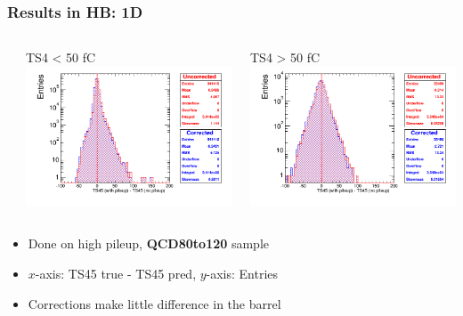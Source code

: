 \documentclass[bigger]{beamer}
\providecommand{\alert}[1]{\textbf{#1}}
\begin{document}
\begin{frame}
\frametitle{Results in HB: 1D}
\label{sec-3-3-3}
\begin{columns} %
\label{sec-3-3-3-1}
\begin{column}{0.55\textwidth}
\label{sec-3-3-3-1-1}

\centering
TS4 < 50 fC
\includegraphics[width=\textwidth]{fig/correction_comparison_1D_sample80to120_under50_ring0.png}
\end{column}
\begin{column}{0.55\textwidth}
\label{sec-3-3-3-1-2}

\centering
TS4 > 50 fC
\includegraphics[width=\textwidth]{fig/correction_comparison_1D_sample80to120_over50_ring0.png}
\end{column}
\end{columns}
\label{sec-3-3-3-2}
\begin{itemize}

\item Done on high pileup, \alert{QCD80to120} sample
\label{sec-3-3-3-2-1}%

\item $x$-axis: TS45 true - TS45 pred, $y$-axis: Entries
\label{sec-3-3-3-2-2}%

\item Corrections make little difference in the barrel
\label{sec-3-3-3-2-3}%
\end{itemize} %
\end{frame}
\end{document}
